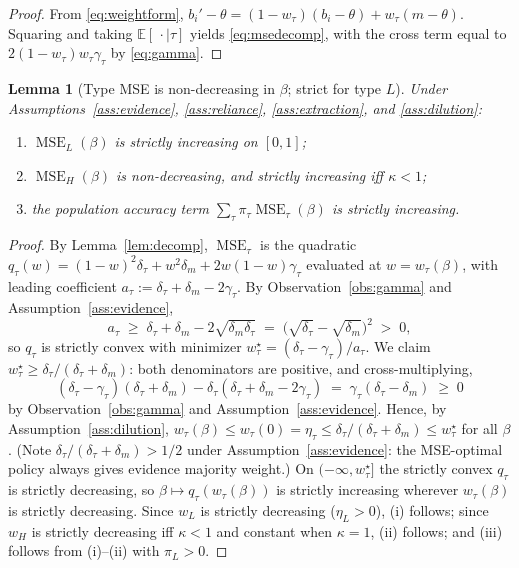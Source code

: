 \documentclass[11pt]{article}
\newtheorem{lemma}[theorem]{Lemma}
\theoremstyle{definition}
\theoremstyle{remark}
\numberwithin{equation}{section}
\DeclareMathOperator{\MSE}{MSE}
\newcommand{\E}{\mathbb{E}}
\begin{document}
\begin{proof}
From \eqref{eq:weightform}, $b_i' - \theta = (1-w_\tau)(b_i - \theta) + w_\tau (m - \theta)$. Squaring and taking $\E[\,\cdot \mid \tau]$ yields \eqref{eq:msedecomp}, with the cross term equal to $2(1-w_\tau)w_\tau \gamma_\tau$ by \eqref{eq:gamma}.
\end{proof}

\begin{lemma}[Type MSE is non-decreasing in $\beta$; strict for type $L$]\label{lem:mse}
Under Assumptions~\ref{ass:evidence}, \ref{ass:reliance}, \ref{ass:extraction}, and \ref{ass:dilution}:
\begin{enumerate}
  \item[(i)] $\MSE_L(\beta)$ is strictly increasing on $[0,1]$;
  \item[(ii)] $\MSE_H(\beta)$ is non-decreasing, and strictly increasing iff $\kappa < 1$;
  \item[(iii)] the population accuracy term $\sum_\tau \pi_\tau \MSE_\tau(\beta)$ is strictly increasing.
\end{enumerate}
\end{lemma}

\begin{proof}
By Lemma~\ref{lem:decomp}, $\MSE_\tau$ is the quadratic $q_\tau(w) = (1-w)^2\delta_\tau + w^2\delta_m + 2w(1-w)\gamma_\tau$ evaluated at $w = w_\tau(\beta)$, with leading coefficient $a_\tau := \delta_\tau + \delta_m - 2\gamma_\tau$. By Observation~\ref{obs:gamma} and Assumption~\ref{ass:evidence},
\[
a_\tau \;\ge\; \delta_\tau + \delta_m - 2\sqrt{\delta_m \delta_\tau} \;=\; \bigl(\sqrt{\delta_\tau} - \sqrt{\delta_m}\bigr)^2 \;>\; 0,
\]
so $q_\tau$ is strictly convex with minimizer $w_\tau^\star = (\delta_\tau-\gamma_\tau)/a_\tau$. We claim $w_\tau^\star \ge \delta_\tau/(\delta_\tau + \delta_m)$: both denominators are positive, and cross-multiplying,
\[
(\delta_\tau - \gamma_\tau)(\delta_\tau + \delta_m) - \delta_\tau(\delta_\tau + \delta_m - 2\gamma_\tau)
\;=\; \gamma_\tau(\delta_\tau - \delta_m) \;\ge\; 0
\]
by Observation~\ref{obs:gamma} and Assumption~\ref{ass:evidence}. Hence, by Assumption~\ref{ass:dilution}, $w_\tau(\beta) \le w_\tau(0) = \eta_\tau \le \delta_\tau/(\delta_\tau + \delta_m) \le w_\tau^\star$ for all $\beta$. (Note $\delta_\tau/(\delta_\tau + \delta_m) > 1/2$ under Assumption~\ref{ass:evidence}: the MSE-optimal policy always gives evidence majority weight.) On $(-\infty, w_\tau^\star]$ the strictly convex $q_\tau$ is strictly decreasing, so $\beta \mapsto q_\tau(w_\tau(\beta))$ is strictly increasing wherever $w_\tau(\beta)$ is strictly decreasing. Since $w_L$ is strictly decreasing ($\eta_L > 0$), (i) follows; since $w_H$ is strictly decreasing iff $\kappa < 1$ and constant when $\kappa = 1$, (ii) follows; and (iii) follows from (i)--(ii) with $\pi_L > 0$.
\end{proof}
\end{document}
